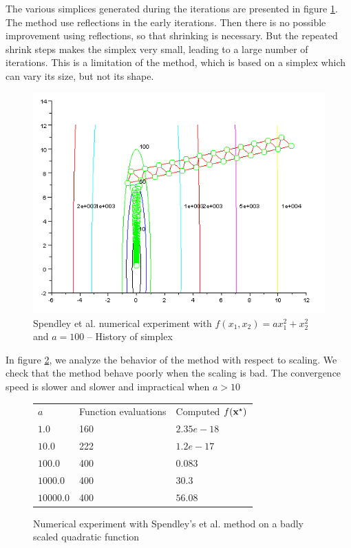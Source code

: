 The various simplices generated during the iterations are 
presented in figure \ref{fig-spendley-numexp2-historysimplex}.
The method use reflections in the early iterations. Then there
is no possible improvement using reflections, so that shrinking is necessary.
But the repeated shrink steps makes the simplex very small, leading to a large number of 
iterations. This is a limitation of the method, which is based on a simplex 
which can vary its size, but not its shape.

\begin{figure}
\begin{center}
\includegraphics[width=15cm]{quad2-spendley-simplexcontours.png}
\end{center}
\caption{Spendley et al. numerical experiment with $f(x_1,x_2) = a x_1^2 + x_2^2$ and $a=100$ -- History of simplex}
\label{fig-spendley-numexp2-historysimplex}
\end{figure}

In figure \ref{fig-spendley-numexp2-scaling}, we analyze the 
behavior of the method with respect to scaling.
We check that the method behave poorly when the scaling is 
bad. The convergence speed is slower and slower and impractical 
when $a>10$

\begin{figure}[htbp]
\begin{center}
\begin{tabular}{|l|l|l|}
\hline
$a$ & Function evaluations & Computed $f(\mathbf{x}^\star)$ \\
$1.0$ & 160 & $2.35e-18$ \\
$10.0$ & 222 & $1.2e-17$ \\
$100.0$ & 400 & $0.083$ \\
$1000.0$ & 400 & $30.3$ \\
$10000.0$ & 400 & $56.08$ \\
\hline
\end{tabular}
\end{center}
\caption{Numerical experiment with Spendley's et al. method on a badly scaled quadratic function}
\label{fig-spendley-numexp2-scaling}
\end{figure}

